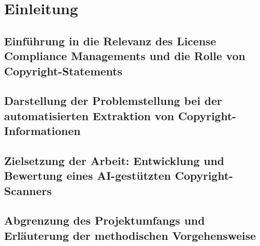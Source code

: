 \chapter{Einleitung}\label{ch:einleitung}

\section{Einführung in die Relevanz des License Compliance Managements und die Rolle von Copyright-Statements}\label{sec:einfuhrung}

\section{Darstellung der Problemstellung bei der automatisierten Extraktion von Copyright-Informationen}\label{sec:problemstellung}


\section{Zielsetzung der Arbeit: Entwicklung und Bewertung eines AI-gestützten Copyright-Scanners}\label{sec:zielsetzung}


\section{Abgrenzung des Projektumfangs und Erläuterung der methodischen Vorgehensweise}\label{sec:abgrenzung}